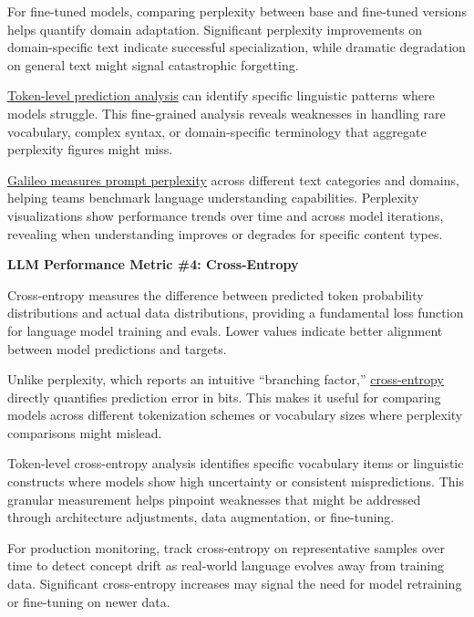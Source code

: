\documentclass[
  letterpaper,
  DIV=11,
  numbers=noendperiod,
  oneside]{scrreprt}
\begin{document}
\begin{tcolorbox}
For fine-tuned models, comparing perplexity between base and fine-tuned
versions helps quantify domain adaptation. Significant perplexity
improvements on domain-specific text indicate successful specialization,
while dramatic degradation on general text might signal catastrophic
forgetting.

\href{https://arxiv.org/pdf/2311.11509}{Token-level prediction analysis}
can identify specific linguistic patterns where models struggle. This
fine-grained analysis reveals weaknesses in handling rare vocabulary,
complex syntax, or domain-specific terminology that aggregate perplexity
figures might miss.

\href{https://docs.galileo.ai/galileo/gen-ai-studio-products/galileo-guardrail-metrics/prompt-perplexity}{Galileo
measures prompt perplexity} across different text categories and
domains, helping teams benchmark language understanding capabilities.
Perplexity visualizations show performance trends over time and across
model iterations, revealing when understanding improves or degrades for
specific content types.

\textbf{LLM Performance Metric \#4: Cross-Entropy}

Cross-entropy measures the difference between predicted token
probability distributions and actual data distributions, providing a
fundamental loss function for language model training and evals. Lower
values indicate better alignment between model predictions and targets.

Unlike perplexity, which reports an intuitive ``branching factor,''
\href{https://medium.com/ai-assimilating-intelligence/cross-entropy-in-large-language-models-llms-4f1c842b5fca}{cross-entropy}
directly quantifies prediction error in bits. This makes it useful for
comparing models across different tokenization schemes or vocabulary
sizes where perplexity comparisons might mislead.

Token-level cross-entropy analysis identifies specific vocabulary items
or linguistic constructs where models show high uncertainty or
consistent mispredictions. This granular measurement helps pinpoint
weaknesses that might be addressed through architecture adjustments,
data augmentation, or fine-tuning.

For production monitoring, track cross-entropy on representative samples
over time to detect concept drift as real-world language evolves away
from training data. Significant cross-entropy increases may signal the
need for model retraining or fine-tuning on newer data.


\end{tcolorbox}
\end{document}
